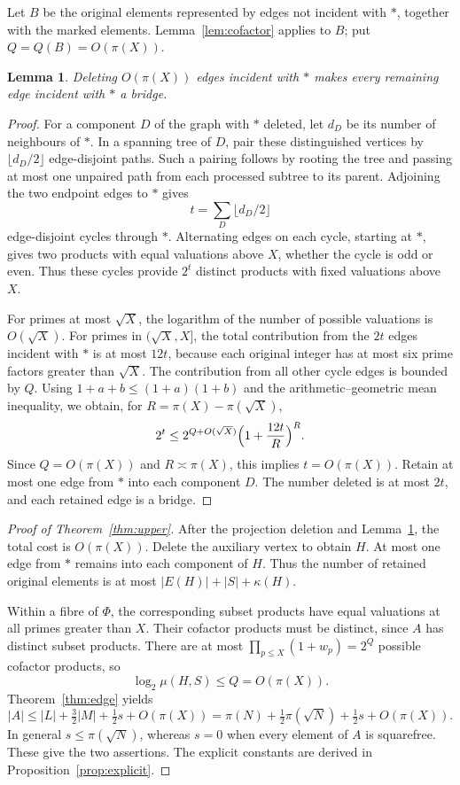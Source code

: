 \documentclass[11pt]{article}
\numberwithin{equation}{section}
\newtheorem{lemma}[theorem]{Lemma}
\theoremstyle{remark}
\begin{document}
Let $B$ be the original elements represented by edges not incident with $*$, together with the marked elements. Lemma~\ref{lem:cofactor} applies to $B$; put $Q=Q(B)=O(\pi(X))$.

\begin{lemma}\label{lem:star}
Deleting $O(\pi(X))$ edges incident with $*$ makes every remaining edge incident with $*$ a bridge.
\end{lemma}

\begin{proof}
For a component $D$ of the graph with $*$ deleted, let $d_D$ be its number of neighbours of $*$. In a spanning tree of $D$, pair these distinguished vertices by $\lfloor d_D/2\rfloor$ edge-disjoint paths. Such a pairing follows by rooting the tree and passing at most one unpaired path from each processed subtree to its parent. Adjoining the two endpoint edges to $*$ gives
\[
t=\sum_D\lfloor d_D/2\rfloor
\]
edge-disjoint cycles through $*$. Alternating edges on each cycle, starting at $*$, gives two products with equal valuations above $X$, whether the cycle is odd or even. Thus these cycles provide $2^t$ distinct products with fixed valuations above $X$.

For primes at most $\sqrt X$, the logarithm of the number of possible valuations is $O(\sqrt X)$. For primes in $(\sqrt X,X]$, the total contribution from the $2t$ edges incident with $*$ is at most $12t$, because each original integer has at most six prime factors greater than $\sqrt X$. The contribution from all other cycle edges is bounded by $Q$. Using $1+a+b\le(1+a)(1+b)$ and the arithmetic--geometric mean inequality, we obtain, for $R=\pi(X)-\pi(\sqrt X)$,
\[
2^t\le2^{Q+O(\sqrt X)}\Bigl(1+\frac{12t}R\Bigr)^R.
\]
Since $Q=O(\pi(X))$ and $R\asymp\pi(X)$, this implies $t=O(\pi(X))$. Retain at most one edge from $*$ into each component $D$. The number deleted is at most $2t$, and each retained edge is a bridge.
\end{proof}

\begin{proof}[Proof of Theorem~\ref{thm:upper}]
After the projection deletion and Lemma~\ref{lem:star}, the total cost is $O(\pi(X))$. Delete the auxiliary vertex to obtain $H$. At most one edge from $*$ remains into each component of $H$. Thus the number of retained original elements is at most $|E(H)|+|S|+\kappa(H)$.

Within a fibre of $\Phi$, the corresponding subset products have equal valuations at all primes greater than $X$. Their cofactor products must be distinct, since $A$ has distinct subset products. There are at most $\prod_{p\le X}(1+w_p)=2^Q$ possible cofactor products, so
\[
\log_2\mu(H,S)\le Q=O(\pi(X)).
\]
Theorem~\ref{thm:edge} yields
\[
|A|\le|L|+\tfrac32|M|+\tfrac12s+O(\pi(X))=\pi(N)+\tfrac12\pi(\sqrt N)+\tfrac12s+O(\pi(X)).
\]
In general $s\le\pi(\sqrt N)$, whereas $s=0$ when every element of $A$ is squarefree. These give the two assertions. The explicit constants are derived in Proposition~\ref{prop:explicit}.
\end{proof}
\end{document}
